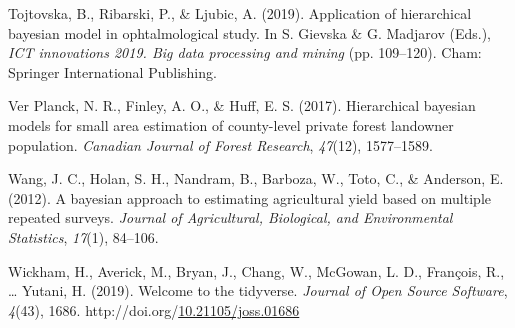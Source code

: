\documentclass[12pt,twoside]{reedthesis}
\newlength{\cslhangindent}
\newenvironment{CSLReferences}[2] %
 {%
  \setlength{\parindent}{0pt}
  \ifodd #1 \everypar{\setlength{\hangindent}{\cslhangindent}}\ignorespaces\fi
  \ifnum #2 > 0
  \setlength{\parskip}{#2\baselineskip}
  \fi
 }%
 {}
\begin{document}
\begin{CSLReferences}{1}{0}
\leavevmode{}%
Tojtovska, B., Ribarski, P., \& Ljubic, A. (2019). Application of hierarchical bayesian model in ophtalmological study. In S. Gievska \& G. Madjarov (Eds.), \emph{ICT innovations 2019. Big data processing and mining} (pp. 109--120). Cham: Springer International Publishing.

\leavevmode{}%
Ver Planck, N. R., Finley, A. O., \& Huff, E. S. (2017). Hierarchical bayesian models for small area estimation of county-level private forest landowner population. \emph{Canadian Journal of Forest Research}, \emph{47}(12), 1577--1589.

\leavevmode{}%
Wang, J. C., Holan, S. H., Nandram, B., Barboza, W., Toto, C., \& Anderson, E. (2012). A bayesian approach to estimating agricultural yield based on multiple repeated surveys. \emph{Journal of Agricultural, Biological, and Environmental Statistics}, \emph{17}(1), 84--106.

\leavevmode{}%
Wickham, H., Averick, M., Bryan, J., Chang, W., McGowan, L. D., François, R., \ldots{} Yutani, H. (2019). Welcome to the {tidyverse}. \emph{Journal of Open Source Software}, \emph{4}(43), 1686. http://doi.org/\href{https://doi.org/10.21105/joss.01686}{10.21105/joss.01686}

\end{CSLReferences}

\end{document}
